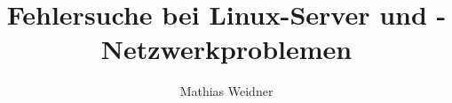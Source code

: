 \documentclass[%
a4paper,                       %
BCOR4mm,                       %
DIVcalc,                       %
11pt,                          %
tablecaptionabove,             %
]{scrreprt}                    %
\providecommand{\includesuffix}{}
\let\includeorig=
\renewcommand{}[1]{\includeorig{#1\includesuffix}}
\begin{document}
\author{Mathias Weidner}
\title{Fehlersuche bei Linux-Server und -Netzwerkproblemen}

\maketitle

%

\tableofcontents 



























\end{document}

